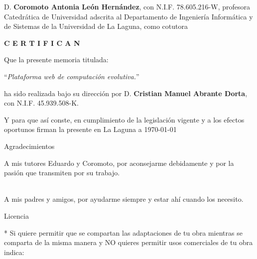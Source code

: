 \documentclass[spanish,a4paper,12pt,oneside]{extreport}
\begin{document}
\bigskip
D. {\bf Coromoto Antonia León Hernández}, con N.I.F. 78.605.216-W,
profesora Catedrática de Universidad
adscrita al Departamento de Ingeniería Informática y de Sistemas
de la Universidad de La Laguna, como cotutora

\bigskip
\bigskip
{\bf C E R T I F I C A N}

\bigskip
\bigskip
\bigskip
Que la presente memoria titulada:

\bigskip
``{\it Plataforma web de computación evolutiva.}''

\bigskip
\bigskip
\bigskip

\noindent ha sido realizada bajo su dirección por D. {\bf Cristian Manuel Abrante Dorta},
con N.I.F. 45.939.508-K.

\bigskip
\bigskip

Y para que así conste, en cumplimiento de la legislación vigente y a los efectos
oportunos firman la presente en La Laguna a \today

\newpage
\thispagestyle{empty}

{ \flushright

\begin{LARGE}
Agradecimientos
\end{LARGE}

\hspace{3mm}

\begin{large}


\hspace{3mm}
A mis tutores Eduardo y Coromoto, por aconsejarme debidamente y por la pasión que transmiten por su trabajo.

\hspace{3mm}
\hspace{3mm} \\
A mis padres y amigos, por ayudarme siempre y estar ahí cuando los necesito.


\end{large}

}

\newpage

\begin{huge}
Licencia
\end{huge}

\bigskip
* Si quiere permitir que se compartan las adaptaciones de tu obra mientras se comparta de la misma manera
y NO quieres permitir usos comerciales de tu obra indica:
\end{document}
